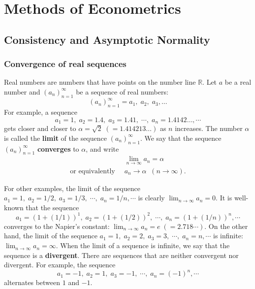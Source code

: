 \documentclass[11pt, A4paper, openany, uplatex]{book}
\begin{document}
\part{Methods of Econometrics}

\chapter{Consistency and Asymptotic Normality}\label{chap:LLN_CLT}
\section{Convergence of real sequences}
Real numbers are numbers that have points on the number line $\mathbb{R}$.
Let $a$ be a real number and $(a_n)_{n=1}^\infty$ be a sequence of real numbers:
\[
	(a_n)_{n=1}^\infty = a_1, \; a_2, \; a_3, \ldots
\]
For example, a sequence
\[
	a_1 = 1, \; a_2 = 1.4, \; a_3 = 1.41, \; \cdots, \; a_n = 1.4142\ldots, \cdots
\]
gets closer and closer to $\alpha = \sqrt{2} \; (= 1.414213\ldots)$ as $n$ increases.
The number $\alpha$ is called the \textbf{limit} of the sequence $(a_n)_{n=1}^\infty$. 
We say that the sequence $(a_n)_{n=1}^\infty$ \textbf{converges} to $\alpha$, and write
\begin{align*}
	& \lim_{n\to\infty}a_n = \alpha \\
	\text{or equivalently} \;\; & a_n \to \alpha \;\; (n\to\infty).
\end{align*}

For other examples, the limit of the sequence $a_1 = 1, \; a_2 = 1/2, \; a_3 = 1/3, \; \cdots, \; a_n = 1/n, \cdots$ is clearly $\lim_{n\to\infty}a_n = 0$.
It is well-known that the sequence
\[
	a_1 = (1 + (1/1))^1, \; a_2 = (1 + (1/2))^2, \; \cdots, \; a_n = (1 + (1/n))^n, \cdots
\]
converges to the Napier's constant: $\lim_{n\to\infty}a_n = e \; (=2.718 \cdots)$.
On the other hand, the limit of the sequence $a_1 = 1, \; a_2 = 2, \; a_3 = 3, \;\cdots, \; a_n = n, \cdots$ is infinite: $\lim_{n\to\infty}a_n = \infty$.
When the limit of a sequence is infinite, we say that the sequence is a \textbf{divergent}.
There are sequences that are neither convergent nor divergent.
For example, the sequence
\[
	a_1 = -1, \; a_2 = 1, \; a_3 = -1, \; \cdots, \; a_n = (-1)^n, \cdots
\]
alternates between $1$ and $-1$.
\end{document}
